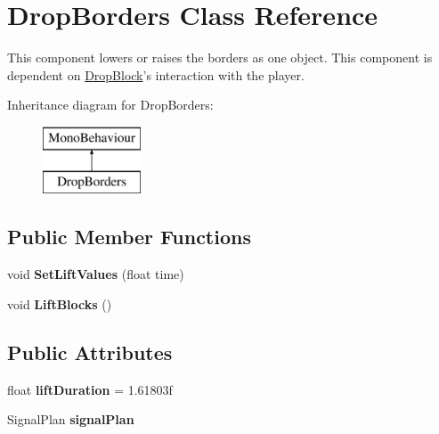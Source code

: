 \hypertarget{class_drop_borders}{\section{Drop\+Borders Class Reference}
\label{class_drop_borders}
}


This component lowers or raises the borders as one object. This component is dependent on \hyperlink{class_drop_block}{Drop\+Block}'s interaction with the player.  


Inheritance diagram for Drop\+Borders\+:\begin{figure}[H]
\begin{center}
\leavevmode
\includegraphics[height=2.000000cm]{class_drop_borders}
\end{center}
\end{figure}
\subsection*{Public Member Functions}
\begin{DoxyCompactItemize}
\item 
\hypertarget{class_drop_borders_a496db05538c10dddd1399bd77bb8f11d}{void {\bfseries Set\+Lift\+Values} (float time)}\label{class_drop_borders_a496db05538c10dddd1399bd77bb8f11d}

\item 
\hypertarget{class_drop_borders_a4d6ea1934875e48ed596c77c7df768a9}{void {\bfseries Lift\+Blocks} ()}\label{class_drop_borders_a4d6ea1934875e48ed596c77c7df768a9}

\end{DoxyCompactItemize}
\subsection*{Public Attributes}
\begin{DoxyCompactItemize}
\item 
\hypertarget{class_drop_borders_a50655a57d9e07d963714c063a423e7f4}{float {\bfseries lift\+Duration} = 1.\+61803f}\label{class_drop_borders_a50655a57d9e07d963714c063a423e7f4}

\item 
\hypertarget{class_drop_borders_ac010c9e198f3c259aed9eb5c528497bf}{Signal\+Plan {\bfseries signal\+Plan}}\label{class_drop_borders_ac010c9e198f3c259aed9eb5c528497bf}

\end{DoxyCompactItemize}


